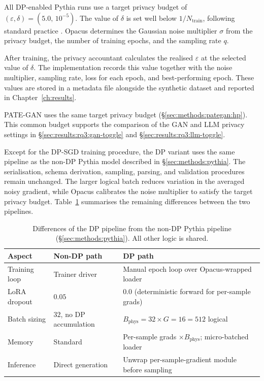 All DP-enabled Pythia runs use a target privacy budget of
$(\varepsilon,\delta)=(5.0,\,10^{-5})$. The value of $\delta$ is set well
below $1/N_{\mathrm{train}}$, following standard practice
\cite{Abadi2016DPSGD}. Opacus determines the Gaussian noise multiplier
$\sigma$ from the privacy budget, the number of training epochs, and the
sampling rate $q$.

After training, the privacy accountant calculates the realised
$\varepsilon$ at the selected value of $\delta$. The implementation records
this value together with the noise multiplier, sampling rate, loss for each
epoch, and best-performing epoch. These values are stored in a metadata file
alongside the synthetic dataset and reported in
Chapter~\ref{ch:results}.

PATE-GAN uses the same target privacy budget
(\S\ref{sec:methods:pategan:hp}). This common budget supports the comparison
of the GAN and LLM privacy settings in
\S\ref{sec:results:rq3:gan-toggle} and
\S\ref{sec:results:rq3:llm-toggle}.

Except for the DP-SGD training procedure, the DP variant uses the same
pipeline as the non-DP Pythia model described in
\S\ref{sec:methods:pythia}. The serialisation, schema derivation, sampling,
parsing, and validation procedures remain unchanged. The larger logical
batch reduces variation in the averaged noisy gradient, while Opacus
calibrates the noise multiplier to satisfy the target privacy budget.
Table~\ref{tab:pythia-dp-diff} summarises the remaining differences between
the two pipelines.

\begin{table}[h]
\centering
\small
\caption{Differences of the DP pipeline from the non-DP Pythia pipeline
(\S\ref{sec:methods:pythia}). All other logic is shared.}
\label{tab:pythia-dp-diff}
\begin{tabular}{lll}
\toprule
Aspect & Non-DP path & DP path \\
\midrule
Training loop & Trainer driver & Manual epoch loop over Opacus-wrapped loader \\
LoRA dropout & $0.05$ & $0.0$ (deterministic forward for per-sample grads) \\
Batch sizing & $32$, no DP accumulation & $B_{\mathrm{phys}}{=}32 \times G{=}16 = 512$ logical \\
Memory & Standard & Per-sample grads $\times B_{\mathrm{phys}}$; micro-batched loader \\
Inference & Direct generation & Unwrap per-sample-gradient module before sampling \\
\bottomrule
\end{tabular}
\end{table}

